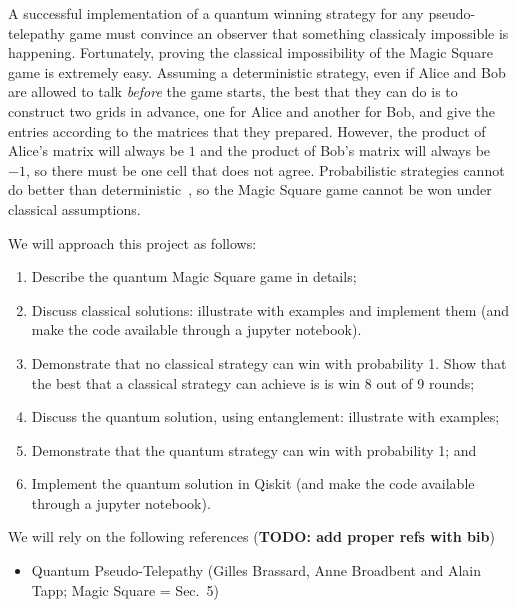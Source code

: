 \documentclass{llncs}
\newcommand{\todo}[1]{{\color{red}\bfseries{}TODO: #1}}
\begin{document}
A successful implementation of a quantum winning strategy for any
pseudo-telepathy game must convince an observer that something
classicaly impossible is happening\cite{brassard:2005}. Fortunately,
proving the classical impossibility of the Magic Square game is
extremely easy. Assuming a deterministic strategy, even if Alice and
Bob are allowed to talk \emph{before} the game starts, the best that
they can do is to construct two grids in advance, one for Alice and
another for Bob, and give the entries according to the matrices
that they prepared. However, the product of Alice's matrix will always
be \(1\) and the product of Bob's matrix will always be \(-1\), so
there must be one cell that does not agree. Probabilistic strategies
cannot do better than deterministic~\cite[Theorem 2]{brassard:2005}, so
the Magic Square game cannot be won under classical assumptions.

We will approach this project as follows:

\begin{enumerate}
\item Describe the quantum Magic Square game in details;
\item Discuss classical solutions: illustrate with examples and
  implement them (and make the code available through a jupyter
  notebook).
\item Demonstrate that no classical strategy can win with probability
  1. Show that the best that a classical strategy can achieve is
  is win 8 out of 9 rounds;
\item Discuss the quantum solution, using entanglement: illustrate
  with examples;
\item Demonstrate that the quantum strategy can win with probability
  1; and
\item Implement the quantum solution in Qiskit
  (and make the code available through a jupyter notebook).
\end{enumerate}

We will rely on the following references (\todo{add proper refs with
  bib})
\begin{itemize}
\item Quantum Pseudo-Telepathy (Gilles Brassard, Anne Broadbent and
  Alain Tapp; Magic Square = Sec.\ 5)
\end{itemize}
\end{document}

